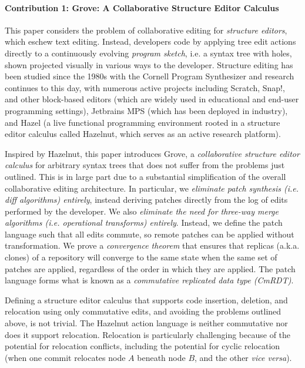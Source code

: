 \paragraph{Contribution 1: Grove: A Collaborative Structure Editor Calculus} 
This paper considers the problem of collaborative editing for \emph{structure editors},
which eschew text editing. Instead, developers code by applying tree edit actions directly to a continuously evolving \emph{program sketch}, i.e. a syntax tree with holes, shown projected visually in various ways to the developer. 
Structure editing has been studied since the 1980s with the Cornell Program Synthesizer 
and research continues to this day, with numerous active projects including Scratch, Snap!, and other block-based editors (which are widely used in educational and end-user programming settings), Jetbrains MPS (which has been deployed in industry), and Hazel (a live functional programming environment rooted in a structure editor calculus called Hazelnut, which serves as 
an active research platform). 

Inspired by Hazelnut, this paper introduces Grove, a \emph{collaborative structure editor calculus} for arbitrary syntax trees that does not suffer from the problems just outlined. 
This is in large part due to a substantial simplification of the overall collaborative
editing architecture. In particular, we \emph{eliminate patch synthesis (i.e. diff algorithms) entirely}, 
instead deriving patches directly from the log of edits performed by the developer. 
We also \emph{eliminate the need for three-way merge algorithms (i.e. operational transforms) entirely}.
Instead, we define the patch language such that all edits commute, 
so remote patches can be applied without transformation. 
We prove a \emph{convergence theorem} that ensures that replicas (a.k.a. clones) of a repository will converge to the same state 
when the same set of patches are applied, regardless of the order in which they are applied.
The patch language forms what is known as a \emph{commutative replicated data type (CmRDT)}.

Defining a structure editor calculus that supports code insertion, deletion, and relocation using only commutative edits, and avoiding the problems outlined above, is not trivial. The Hazelnut action language is neither commutative nor does it support relocation. 
Relocation is particularly challenging because of the potential for relocation conflicts,
including the potential for cyclic relocation (when one commit relocates node $A$ beneath node $B$, and the other \emph{vice versa}). 

